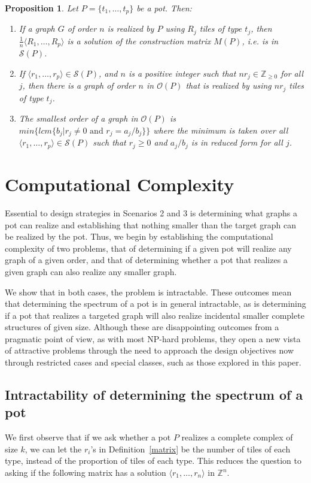 \documentclass{elsarticle}
\newtheorem{proposition}[theorem]{Proposition}
\theoremstyle{definition}
\theoremstyle{remark}
\theoremstyle{plain}
\theoremstyle{plain}
\begin{document}
\begin{proposition}\label{spectrum}
Let $P=\{t_1, \ldots , t_p\}$ be a pot.  Then:

\begin{enumerate}
    \item If a graph $G$ of order $n$ is realized by $P$ using $R_j$ tiles of type $t_j$, then $\frac{1}{n}\langle R_1, \ldots, R_p\rangle$ is a solution of the construction matrix $M(P)$, i.e. is in $\mathcal{S}(P)$.
    \item If $\langle r_1, \ldots, r_p \rangle \in \mathcal{S}(P)$, and $n$ is a positive integer such that $nr_j \in \mathbb{Z}_{\geq 0}$ for all $j$, then there is a graph of order $n$ in $\mathcal{O}(P)$ that is realized by using $nr_j$ tiles of type $t_j$. 
    \item  The smallest order of a graph in $\mathcal{O}(P)$ is $min \{lcm \{b_j|r_j \neq 0 \text{ and } r_j = a_j/b_j\}\}$ where the minimum is taken over all $\langle r_1,\ldots,r_p\rangle \in \mathcal{S}(P)$ such that $r_j \geq 0$ and $a_j/b_j$ is in reduced form for all $j$.
\end{enumerate}
\end{proposition}

\section{Computational Complexity}\label{sec:prob diff}

Essential to design strategies in Scenarios 2 and 3 is determining what graphs a pot can realize and establishing that nothing smaller than the target graph can be realized by the pot.  Thus, we begin by establishing the computational complexity of two problems, that of determining if a given pot will realize any graph of a given order, and that of determining whether a pot that realizes a given graph can also realize any smaller graph. 

We show that in both cases, the problem is intractable.  These outcomes mean that determining the spectrum of a pot is in general intractable, as is determining if a pot that realizes a targeted graph will also realize incidental smaller complete structures of given size.  Although these are disappointing outcomes from a pragmatic point of view, as with most NP-hard problems, they open a new vista of attractive problems through the need to approach the design objectives now through restricted cases and special classes, such as those explored in this paper.
 \subsection{Intractability of determining the spectrum of a pot}
We first observe that if we ask whether a pot $P$ realizes a complete complex of size $k$, we can let the $r_i$'s in Definition~\ref{matrix} be the number of tiles of each type, instead of the proportion of tiles of each type.  This reduces the question to asking if the following matrix has a solution  $\langle r_1 , \ldots , r_n\rangle$ in $\mathbb{Z}^n$.  
\end{document}
